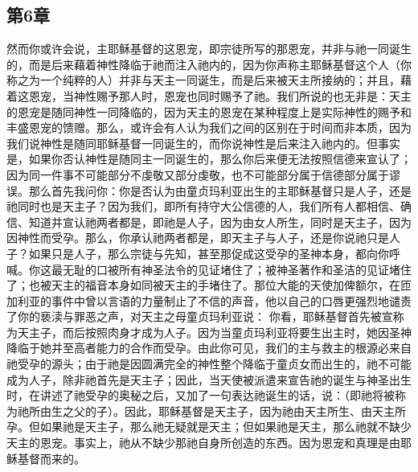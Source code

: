 
\subsection{第6章}

\par

然而你或许会说，主耶稣基督的这恩宠，即宗徒所写的那恩宠，并非与祂一同诞生的，而是后来藉着神性降临于祂而注入祂内的，因为你声称主耶稣基督这个人（你称之为一个纯粹的人）并非与天主一同诞生，而是后来被天主所接纳的；并且，藉着这恩宠，当神性赐予那人时，恩宠也同时赐予了祂。我们所说的也无非是：天主的恩宠是随同神性一同降临的，因为天主的恩宠在某种程度上是实际神性的赐予和丰盛恩宠的馈赠。那么，或许会有人认为我们之间的区别在于时间而非本质，因为我们说神性是随同耶稣基督一同诞生的，而你说神性是后来注入祂内的。但事实是，如果你否认神性是随同主一同诞生的，那么你后来便无法按照信德来宣认了；因为同一件事不可能部分不虔敬又部分虔敬，也不可能部分属于信德部分属于谬误。那么首先我问你：你是否认为由童贞玛利亚出生的主耶稣基督只是人子，还是祂同时也是天主子？因为我们，即所有持守大公信德的人，我们所有人都相信、确信、知道并宣认祂两者都是，即祂是人子，因为由女人所生，同时是天主子，因为因神性而受孕。那么，你承认祂两者都是，即天主子与人子，还是你说祂只是人子？如果只是人子，那么宗徒与先知，甚至那促成这受孕的圣神本身，都向你呼喊。你这最无耻的口被所有神圣法令的见证堵住了；被神圣著作和圣洁的见证堵住了；也被天主的福音本身如同被天主的手堵住了。那位大能的天使加俾额尔，在匝加利亚的事件中曾以言语的力量制止了不信的声音，他以自己的口唇更强烈地谴责了你的亵渎与罪恶之声，对天主之母童贞玛利亚说：  你看，耶稣基督首先被宣称为天主子，而后按照肉身才成为人子。因为当童贞玛利亚将要生出主时，她因圣神降临于她并至高者能力的合作而受孕。由此你可见，我们的主与救主的根源必来自祂受孕的源头；由于祂是因圆满完全的神性整个降临于童贞女而出生的，祂不可能成为人子，除非祂首先是天主子；因此，当天使被派遣来宣告祂的诞生与神圣出生时，在讲述了祂受孕的奥秘之后，又加了一句表达祂诞生的话，说：（即祂将被称为祂所由生之父的子）。因此，耶稣基督是天主子，因为祂由天主所生、由天主所孕。但如果祂是天主子，那么祂无疑就是天主；但如果祂是天主，那么祂就不缺少天主的恩宠。事实上，祂从不缺少那祂自身所创造的东西。因为恩宠和真理是由耶稣基督而来的。\par

